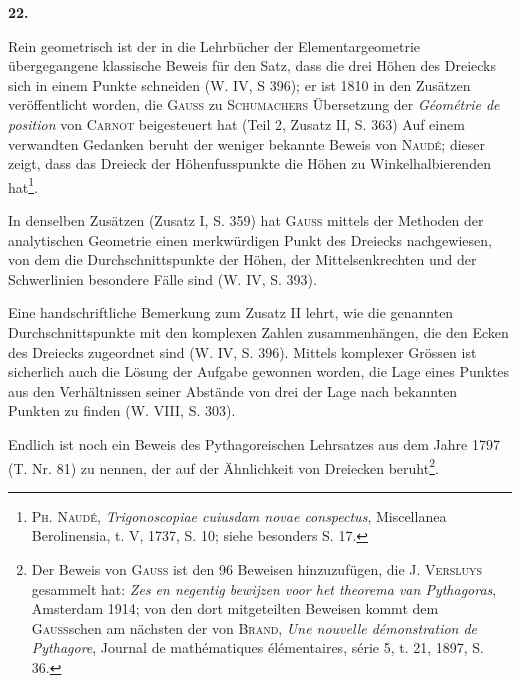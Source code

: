 \clearpage\begingroup{}
\renewcommand{\thefootnote}{\arabic{footnote})}\setcounter{footnote}{1}
\begin{center}
\textbf{22.}\par\smallskip
{}
\end{center}
\noindent\hspace*{\parindent}Rein geometrisch ist der in die Lehrbücher der Elementargeometrie übergegangene
klassische Beweis für den Satz, dass die drei Höhen des Dreiecks
sich in einem Punkte schneiden (W. IV, S 396); er ist 1810 in den Zusätzen
veröffentlicht worden, die \textsc{Gauss} zu \textsc{Schumachers} Übersetzung der \textit{Géométrie de
position} von \textsc{Carnot} beigesteuert hat (Teil 2, Zusatz II, S. 363) Auf einem
verwandten Gedanken beruht der weniger bekannte Beweis von \textsc{Naudé}; dieser
zeigt, dass das Dreieck der Höhenfusspunkte die Höhen zu Winkelhalbierenden
hat\footnote{\textsc{Ph. Naudé}, \textit{Trigonoscopiae cuiusdam novae conspectus}, Miscellanea Berolinensia, t. V, 1737, S. 10; siehe besonders S. 17.}.
\par
In denselben Zusätzen (Zusatz I, S. 359) hat \textsc{Gauss} mittels der Methoden
der analytischen Geometrie einen merkwürdigen Punkt des Dreiecks
\clearpage{}\setcounter{footnote}{0}
\noindent nachgewiesen, von dem die Durchschnittspunkte der Höhen, der Mittelsenkrechten
und der Schwerlinien besondere Fälle sind (W. IV, S. 393).
\par
Eine handschriftliche Bemerkung zum Zusatz II lehrt, wie die genannten
Durchschnittspunkte mit den komplexen Zahlen zusammenhängen, die den
Ecken des Dreiecks zugeordnet sind (W. IV, S. 396). Mittels komplexer
Grössen ist sicherlich auch die Lösung der Aufgabe gewonnen worden, die
Lage eines Punktes aus den Verhältnissen seiner Abstände von drei der Lage
nach bekannten Punkten zu finden (W. VIII, S. 303).
\par
Endlich ist noch ein Beweis des Pythagoreischen Lehrsatzes aus dem Jahre
1797 (T. Nr. 81) zu nennen, der auf der Ähnlichkeit von Dreiecken beruht\footnote{Der Beweis von \textsc{Gauss} ist den 96 Beweisen hinzuzufügen, die J. \textsc{Versluys} gesammelt hat: \textit{Zes en negentig bewijzen voor het theorema van Pythagoras}, Amsterdam 1914; von den dort mitgeteilten Beweisen kommt dem \textsc{Gauss}schen am nächsten der von \textsc{Brand}, \textit{Une nouvelle démonstration de Pythagore}, Journal de mathématiques élémentaires, série 5, t. 21, 1897, S. 36.}.
\clearpage\endgroup
